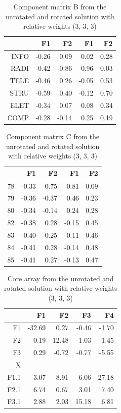 \documentclass[article,shortnames, nojss]{jss}
\begin{document}
\begin{table}[H]
\centering
\begin{tabular}{rrrrr}
  \hline
 & F1 & F2 & F1 & F2 \\ 
  \hline
INFO & -0.26 & 0.09 & 0.02 & 0.28 \\ 
  RADI & -0.42 & -0.86 & 0.96 & 0.03 \\ 
  TELE & -0.46 & 0.26 & -0.05 & 0.53 \\ 
  STRU & -0.59 & 0.40 & -0.12 & 0.70 \\ 
  ELET & -0.34 & 0.07 & 0.08 & 0.34 \\ 
  COMP & -0.28 & -0.14 & 0.25 & 0.19 \\ 
   \hline
\end{tabular}
\caption{Component matrix B from the unrotated and
    rotated solution with relative weights (3, 3, 3)} 
\label{tab:varimax-B}
\end{table}
\begin{table}[H]
\centering
\begin{tabular}{rrrrr}
  \hline
 & F1 & F2 & F1 & F2 \\ 
  \hline
78 & -0.33 & -0.75 & 0.81 & 0.09 \\ 
  79 & -0.36 & -0.37 & 0.46 & 0.23 \\ 
  80 & -0.34 & -0.14 & 0.24 & 0.28 \\ 
  82 & -0.38 & 0.28 & -0.15 & 0.45 \\ 
  83 & -0.40 & 0.25 & -0.11 & 0.46 \\ 
  84 & -0.41 & 0.28 & -0.14 & 0.48 \\ 
  85 & -0.41 & 0.27 & -0.13 & 0.47 \\ 
   \hline
\end{tabular}
\caption{Component matrix C from the unrotated and
    rotated solution with relative weights (3, 3, 3)} 
\label{tab:varimax-C}
\end{table}
\begin{table}[H]
\centering
\begin{tabular}{rrrrr}
  \hline
 & F1 & F2 & F3 & F4 \\ 
  \hline
F1 & -32.69 & 0.27 & -0.46 & -1.70 \\ 
  F2 & 0.19 & 12.48 & -1.03 & -1.45 \\ 
  F3 & 0.29 & -0.72 & -0.77 & -5.55 \\ 
  X &  &  &  &  \\ 
  F1.1 & 3.07 & 8.91 & 6.06 & 27.18 \\ 
  F2.1 & 6.74 & 0.67 & 3.01 & 7.40 \\ 
  F3.1 & 2.88 & 2.03 & 15.18 & 6.81 \\ 
   \hline
\end{tabular}
\caption{Core array from the unrotated and rotated
    solution with relative weights (3, 3, 3)} 
\label{tab:varimax-core}
\end{table}
\end{document}
